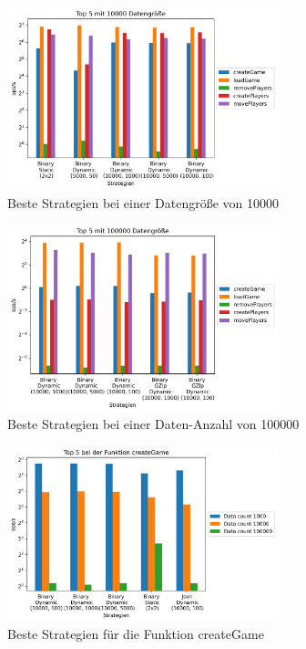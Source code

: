 \begin{figure}[htp]
    \centering
    \includegraphics[width=0.7\textwidth]{images/plots/10000.png}
    \caption{Beste Strategien bei einer Datengröße von 10000}
    \label{fig:middleDataCount}
\end{figure}

\begin{figure}[htp]
    \centering
    \includegraphics[width=0.7\textwidth]{images/plots/100000.png}
    \caption{Beste Strategien bei einer Daten-Anzahl von 100000}
    \label{fig:bigDataCount}
\end{figure}

\begin{figure}[htp]
    \centering
    \includegraphics[width=0.7\textwidth]{images/plots/createGame.png}
    \caption{Beste Strategien für die Funktion createGame}
    \label{fig:createGame}
\end{figure}


